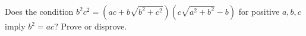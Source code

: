 Does the condition $b^2c^2=(ac+b\sqrt{b^2+c^2})(c\sqrt{a^2+b^2}-b)$ for positive $a,b,c$ imply $b^2=ac$? Prove or disprove.

